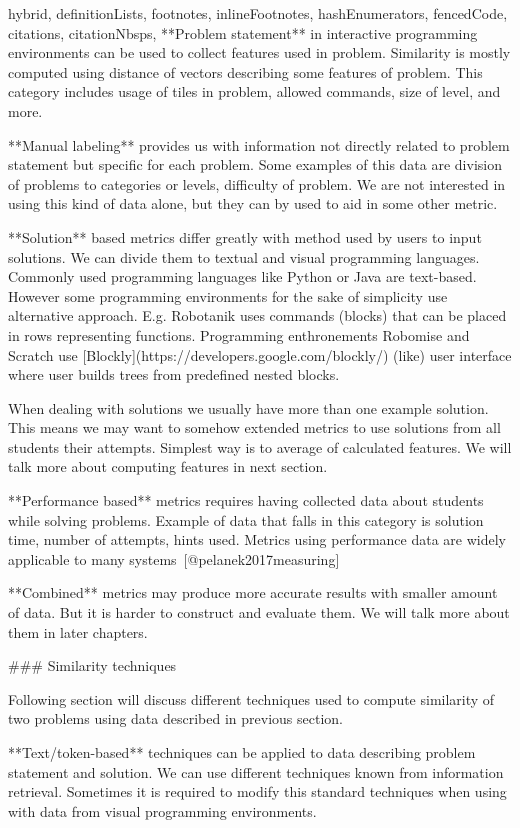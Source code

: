 \documentclass[
  digital, %
  table,   %
  nolof,     %
  nolot,     %
  nocover
]{fithesis3}
\begin{document}
\begin{markdown*}{%
  hybrid,
  definitionLists,
  footnotes,
  inlineFootnotes,
  hashEnumerators,
  fencedCode,
  citations,
  citationNbsps,
}
**Problem statement** in interactive programming environments can be used to collect features used in problem. Similarity is mostly computed using distance of vectors describing some features of problem. This category includes usage of tiles in problem, allowed commands, size of level, and more.

**Manual labeling** provides us with information not directly related to problem statement but specific for each problem. Some examples of this data are division of problems to categories or levels, difficulty of problem. We are not interested in using this kind of data alone, but they can by used to aid in some other metric.

**Solution** based metrics differ greatly with method used by users to input solutions. We can divide them to textual and visual programming languages. Commonly used programming languages like Python or Java are text-based. However some programming environments for the sake of simplicity use alternative approach. E.g. Robotanik uses commands (blocks) that can be placed in rows representing functions. Programming enthronements Robomise and Scratch use [Blockly](https://developers.google.com/blockly/) (like) user interface where user builds trees from predefined nested blocks.

When dealing with solutions we usually have more than one example solution. This means we may want to somehow extended metrics to use solutions from all students their attempts. Simplest way is to average of calculated features. We will talk more about computing features in next section.

**Performance based** metrics requires having collected data about students while solving problems. Example of data that falls in this category is solution time, number of attempts, hints used. Metrics using performance data are widely applicable to many systems~[@pelanek2017measuring]

**Combined** metrics may produce more accurate results with smaller amount of data. But it is harder to construct and evaluate them. We will talk more about them in later chapters.

### Similarity techniques

Following section will discuss different techniques used to compute similarity of two problems using data described in previous section.

**Text/token-based** techniques can be applied to data describing problem statement and solution. We can use different techniques known from information retrieval. Sometimes it is required to modify this standard techniques when using with data from visual programming environments.


\end{markdown*}
\end{document}
